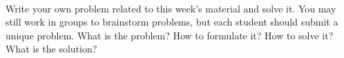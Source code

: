 \documentclass[11pt]{article}
\newif\ifsolutions
\renewcommand{\answer}[1]{{\color{mydarkblue}\textbf{Solutions: }#1}}
\begin{document}
\begin{qunlist}
\begin{itemize}
\end{itemize}




 \\
Write your own problem related to this week's material and solve it. 
You may still work in groups to brainstorm problems, but each student should submit a unique problem. 
What is the problem? How to formulate it? How to solve it? What is the solution?

\ifsolutions
\answer{
See related piazza posts.
}
\fi

\end{qunlist}
\end{document}
